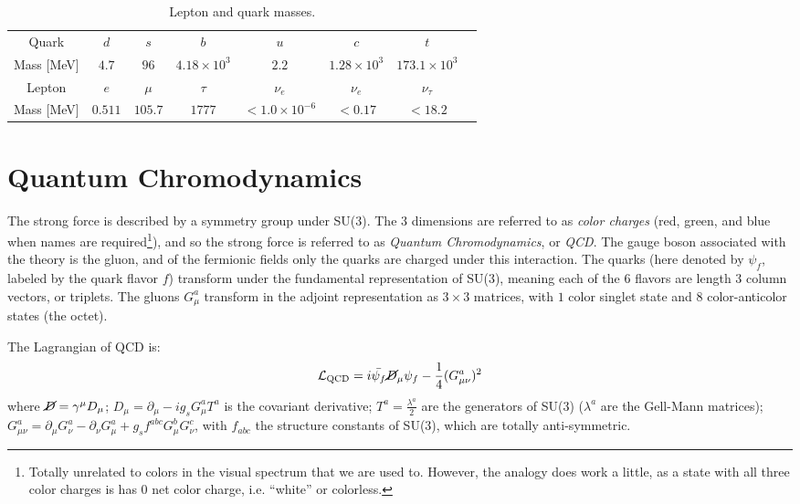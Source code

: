 \begin{table}[]
\centering
\caption{Lepton and quark masses.}
\label{tab:SM:masses}
\begin{tabular}{c c c c c c c c}
\hline
Quark & $d$ & $s$ & $b$ & $u$ & $c$ & $t$ & \\
Mass [MeV] & $4.7$ & $96$ & $4.18\times10^3$ & $2.2$ & $1.28\times10^3$ & $173.1\times10^3$\\
\hline
Lepton & $e$ & $\mu$ & $\tau$ & $\nu_e$ & $\nu_e$ & $\nu_\tau$ & \\
Mass [MeV] & $0.511$ & $105.7$ & $1777$ & $<1.0\times10^{-6}$ & $<0.17$ & $<18.2$
\end{tabular}
\end{table}

\section{Quantum Chromodynamics}
\label{sec:SM:QCD}
The strong force is described by a symmetry group under SU(3).
The $3$ dimensions are referred to as \textit{color charges} (red, green, and blue when names are required\footnote{Totally unrelated to colors in the visual spectrum that we are used to. However, the analogy does work a little, as a state with all three color charges is has $0$ net color charge, i.e. ``white'' or colorless.}), and so the strong force is referred to as \textit{Quantum Chromodynamics}, or \textit{QCD}.
The gauge boson associated with the theory is the gluon, and of the fermionic fields only the quarks are charged under this interaction.
The quarks (here denoted by $\psi_f$, labeled by the quark flavor $f$) transform under the fundamental representation of SU(3), meaning each of the $6$ flavors are length $3$ column vectors, or triplets.
The gluons $G_\mu^a$ transform in the adjoint representation as $3\times 3$ matrices, with $1$ color singlet state and $8$ color-anticolor states (the octet).

The Lagrangian of QCD is:
\begin{align}
  \mathcal{L}_\text{QCD} = i\bar{\psi_f}\cancel{D}_\mu\psi_f-\frac{1}{4}(G_{\mu\nu}^a)^2
\end{align}
where $\cancel{D}=\gamma^\mu D_\mu$; $D_\mu = \partial_\mu - ig_sG_\mu^aT^a$ is the covariant derivative; $T^a=\frac{\lambda^a}{2}$ are the generators of SU(3) ($\lambda^a$ are the Gell-Mann matrices); $G_{\mu\nu}^a = \partial_\mu G_\nu^a-\partial_\nu G_\mu^a + g_s f^{abc} G_\mu^b G_\nu^c$, with $f_{abc}$ the structure constants of SU(3), which are totally anti-symmetric.

